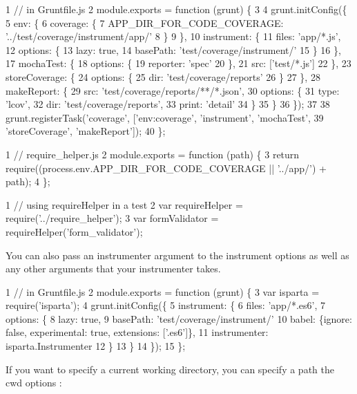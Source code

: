 \begin{DoxyCode}
1 // in Gruntfile.js
2 module.exports = function (grunt) \{
3 
4   grunt.initConfig(\{
5     env: \{
6       coverage: \{
7         APP\_DIR\_FOR\_CODE\_COVERAGE: '../test/coverage/instrument/app/'
8       \}
9     \},
10     instrument: \{
11       files: 'app/*.js',
12       options: \{
13         lazy: true,
14         basePath: 'test/coverage/instrument/'
15       \}
16     \},
17     mochaTest: \{
18       options: \{
19         reporter: 'spec'
20       \},
21       src: ['test/*.js']
22     \},
23     storeCoverage: \{
24       options: \{
25         dir: 'test/coverage/reports'
26       \}
27     \},
28     makeReport: \{
29       src: 'test/coverage/reports/**/*.json',
30       options: \{
31         type: 'lcov',
32         dir: 'test/coverage/reports',
33         print: 'detail'
34       \}
35     \}
36   \});
37 
38   grunt.registerTask('coverage', ['env:coverage', 'instrument', 'mochaTest',
39     'storeCoverage', 'makeReport']);
40 \};
\end{DoxyCode}
 
\begin{DoxyCode}
1 // require\_helper.js
2 module.exports = function (path) \{
3   return require((process.env.APP\_DIR\_FOR\_CODE\_COVERAGE || '../app/') + path);
4 \};
\end{DoxyCode}
 
\begin{DoxyCode}
1 // using requireHelper in a test
2 var requireHelper = require('../require\_helper');
3 var formValidator = requireHelper('form\_validator');
\end{DoxyCode}


You can also pass an {\ttfamily instrumenter} argument to the instrument {\ttfamily options} as well as any other arguments that your instrumenter takes.


\begin{DoxyCode}
1 // in Gruntfile.js
2 module.exports = function (grunt) \{
3  var isparta = require('isparta');
4   grunt.initConfig(\{
5     instrument: \{
6       files: 'app/*.es6',
7       options: \{
8         lazy: true,
9         basePath: 'test/coverage/instrument/'
10         babel: \{ignore: false, experimental: true, extensions: ['.es6']\},
11         instrumenter: isparta.Instrumenter
12       \}
13     \}
14   \});
15 \};
\end{DoxyCode}


If you want to specify a current working directory, you can specify a path the cwd {\ttfamily options} \+:


